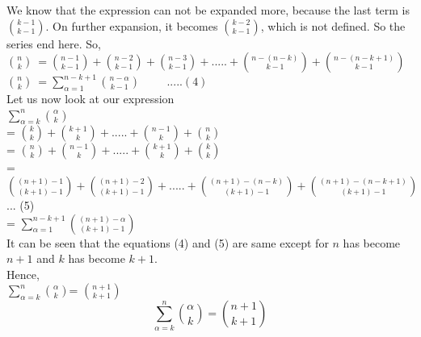 \documentclass{llncs}
\begin{document}
We know that the expression can not be expanded more, because the last term is $\binom{k-1}{k-1}$. On further expansion, it becomes $\binom{k-2}{k-1}$, which is not defined. So the series end here. So, \\

$\binom{n}{k}\ = \binom{n-1}{k-1} + \binom{n-2}{k-1} + \binom{n-3}{k-1} + ..... + \binom{n-(n-k)}{k-1} + \binom{n-(n-k+1)}{k-1}$ \hspace{1cm} \\


$\binom{n}{k}\ = \sum_{\alpha=1}^{n-k+1} \binom{n-\alpha}{k-1} \hspace{1cm} ..... (4) $  \\

Let us now look at our expression\\

$\sum_{\alpha=k}^n \binom{\alpha}{k}$\\

= $\binom{k}{k} + \binom{k+1}{k} + ..... + \binom{n-1}{k} + \binom{n}{k}$\\

= $\binom{n}{k}+ \binom{n-1}{k} + .....  + \binom{k+1}{k} + \binom{k}{k} $\\ 

=  $\binom{(n+1)-1}{(k+1)-1}+ \binom{(n+1)-2}{(k+1)-1} + .....  + \binom{(n+1)-(n-k)}{(k+1)-1} + \binom{(n+1)-(n-k+1)}{(k+1)-1} $\hspace{1cm} ... (5)\\

= $\sum_{\alpha=1}^{n-k+1} \binom{(n+1)-\alpha}{(k+1)-1}$\\

It can be seen that the equations (4) and (5) are same except for $n$ has become $n+1$ and $k$ has become $k+1$. \\
Hence, \\

$\sum_{\alpha=k}^n \binom{\alpha}{k}$= $\binom{n+1}{k+1}$\\
\[
 \boxed{\sum_{\alpha=k}^n \binom{\alpha}{k}= \binom{n+1}{k+1}}
 \]
\end{document}
